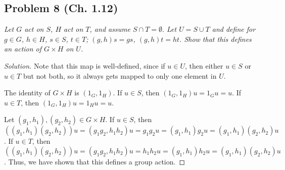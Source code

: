 \documentclass{article}
\begin{document}
\subsection*{Problem 8 (Ch. 1.12)}
{\it Let $G$ act on $S$, $H$ act on $T$, and assume $S \cap T = \emptyset.$
Let $U = S \cup T$ and define for $g \in G$, $h \in H$, $s \in S$, $t \in T$;
$(g,h)s = gs$, $(g,h)t = ht$.
Show that this defines an action of $G \times H$ on $U$.}
\begin{proof}[Solution]\let\qed\relax
	Note that this map is well-defined,
	since if $u \in U$, then either $u \in S$ or $u \in T$
	but not both,
	so it always gets mapped to only one element in $U$.

	The identity of $G \times H$ is $(1_G, 1_H)$.
	If $u \in S$, then $(1_G, 1_H)u = 1_Gu = u$.
	If $u \in T$, then $(1_G, 1_H)u = 1_Hu = u$.

	Let $(g_1,h_1),(g_2,h_2) \in G \times H$.
	If $u \in S$, then $((g_1,h_1)(g_2,h_2))u = (g_1g_2,h_1h_2)u
	= g_1g_2u = (g_1,h_1)g_2u = (g_1,h_1)(g_2,h_2)u$.
	If $u \in T$, then $((g_1,h_1)(g_2,h_2))u = (g_1g_2,h_1h_2)u
	= h_1h_2u = (g_1,h_1)h_2u = (g_1,h_1)(g_2,h_2)u$.
	Thus, we have shown that this defines a group action.
\end{proof}
\end{document}
